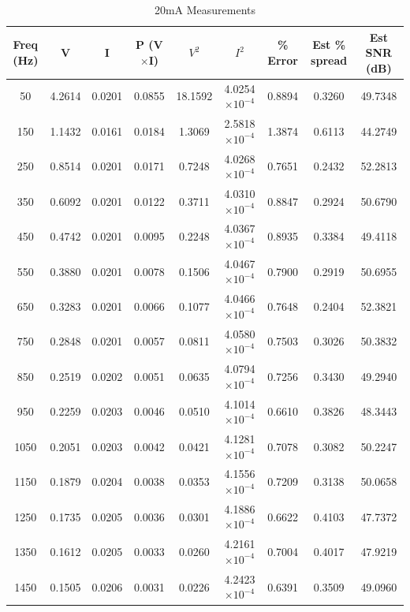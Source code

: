 \begin{table}[htbp]
  \centering
  \caption{20mA Measurements}
  \label{tab:20ma}
  \small
  \begin{tabular}{|c|c|c|c|c|c|c|c|c|}
    \hline
    \textbf{Freq (Hz)} & \textbf{V} & \textbf{I} & \textbf{P (V$\times$I)} & \textbf{$V^2$} & \textbf{$I^2$} & \textbf{\% Error} & \textbf{Est \% spread} & \textbf{Est SNR (dB)} \\
    \hline
    50 & 4.2614 & 0.0201 & 0.0855 & 18.1592 & 4.0254$\times 10^{-4}$ & 0.8894 & 0.3260 & 49.7348 \\
    150 & 1.1432 & 0.0161 & 0.0184 & 1.3069 & 2.5818$\times 10^{-4}$ & 1.3874 & 0.6113 & 44.2749 \\
    250 & 0.8514 & 0.0201 & 0.0171 & 0.7248 & 4.0268$\times 10^{-4}$ & 0.7651 & 0.2432 & 52.2813 \\
    350 & 0.6092 & 0.0201 & 0.0122 & 0.3711 & 4.0310$\times 10^{-4}$ & 0.8847 & 0.2924 & 50.6790 \\
    450 & 0.4742 & 0.0201 & 0.0095 & 0.2248 & 4.0367$\times 10^{-4}$ & 0.8935 & 0.3384 & 49.4118 \\
    \hline
    550 & 0.3880 & 0.0201 & 0.0078 & 0.1506 & 4.0467$\times 10^{-4}$ & 0.7900 & 0.2919 & 50.6955 \\
    650 & 0.3283 & 0.0201 & 0.0066 & 0.1077 & 4.0466$\times 10^{-4}$ & 0.7648 & 0.2404 & 52.3821 \\
    750 & 0.2848 & 0.0201 & 0.0057 & 0.0811 & 4.0580$\times 10^{-4}$ & 0.7503 & 0.3026 & 50.3832 \\
    850 & 0.2519 & 0.0202 & 0.0051 & 0.0635 & 4.0794$\times 10^{-4}$ & 0.7256 & 0.3430 & 49.2940 \\
    950 & 0.2259 & 0.0203 & 0.0046 & 0.0510 & 4.1014$\times 10^{-4}$ & 0.6610 & 0.3826 & 48.3443 \\
    \hline
    1050 & 0.2051 & 0.0203 & 0.0042 & 0.0421 & 4.1281$\times 10^{-4}$ & 0.7078 & 0.3082 & 50.2247 \\
    1150 & 0.1879 & 0.0204 & 0.0038 & 0.0353 & 4.1556$\times 10^{-4}$ & 0.7209 & 0.3138 & 50.0658 \\
    1250 & 0.1735 & 0.0205 & 0.0036 & 0.0301 & 4.1886$\times 10^{-4}$ & 0.6622 & 0.4103 & 47.7372 \\
    1350 & 0.1612 & 0.0205 & 0.0033 & 0.0260 & 4.2161$\times 10^{-4}$ & 0.7004 & 0.4017 & 47.9219 \\
    1450 & 0.1505 & 0.0206 & 0.0031 & 0.0226 & 4.2423$\times 10^{-4}$ & 0.6391 & 0.3509 & 49.0960 \\

\end{tabular}
\end{table}
